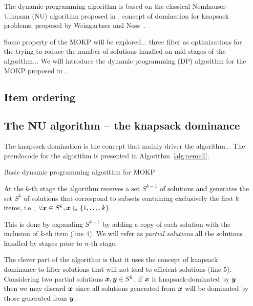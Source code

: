 

The dynamic programming algorithm is based on the classical Nemhauser-Ullmann (NU) algorithm proposed
in \cite{nemhauser1969discrete}.
concept of domination for knapsack problems,
proposed by Weingartner and Ness~\cite{weingartner1967methods}.

Some property of the MOKP will be explored...
three filter as optimizations for the trying
to reduce the number of solutions
handled on mid stages of the algorithm...
We will introduce the dynamic programming (DP) algorithm for the MOKP proposed in \cite{bazgan2009}.


\subsection{Item ordering}

\subsection{The NU algorithm -- the knapsack dominance}
The knapsack-domination is the concept that mainly driver the algorithm...
The pseudocode for the algorithm is presented in Algorithm~\ref{alg:nemull}.
\begin{algorithm}
  \caption{Basic dynamic programming algorithm for MOKP}
  \label{alg:nemull}
  
\end{algorithm}
At the $k$-th stage the algorithm receives a set $S^{k-1}$ of solutions and
generates the set $S^k$ of solutions that correspond
to subsets containing exclusively the first $k$ items, i.e.\,,
$\forall\boldsymbol{x} \in S^k, \boldsymbol{x} \subseteq \{1, \ldots, k\}$.

This is done by expanding $S^{k-1}$ by adding a copy of each solution with the
inclusion of $k$-th item (line 4).
We will refer as \emph{partial solutions} all the solutions handled by
stages prior to $n$-th stage.

The clever part of the algorithm is that it uses the concept of knapsack dominance
to filter solutions that will not lead to efficient solutions (line 5).
Considering two partial solutions $\boldsymbol{x}, \boldsymbol{y} \in S^k$, if
$\boldsymbol{x}$ is knapsack-dominated by $\boldsymbol{y}$ then we may discard $\boldsymbol{x}$ since all
solutions generated from $\boldsymbol{x}$ will be dominated by those generated from $\boldsymbol{y}$.


